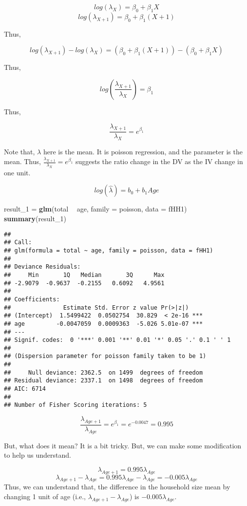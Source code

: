 \documentclass[]{book}
\newenvironment{Shaded}{\begin{snugshade}}{\end{snugshade}}
\newcommand{\DataTypeTok}[1]{\textcolor[rgb]{0.13,0.29,0.53}{#1}}
\newcommand{\DecValTok}[1]{\textcolor[rgb]{0.00,0.00,0.81}{#1}}
\newcommand{\KeywordTok}[1]{\textcolor[rgb]{0.13,0.29,0.53}{\textbf{#1}}}
\newcommand{\NormalTok}[1]{#1}
\newcommand{\OperatorTok}[1]{\textcolor[rgb]{0.81,0.36,0.00}{\textbf{#1}}}
\newcommand{\StringTok}[1]{\textcolor[rgb]{0.31,0.60,0.02}{#1}}
\begin{document}
\[log (\lambda_X) =\beta_0+\beta_1 X\]
\[log (\lambda_{X+1}) =\beta_0+\beta_1 (X+1)\]

Thus,

\[log (\lambda_{X+1})-log (\lambda_X) =(\beta_0+\beta_1 (X+1))-(\beta_0+\beta_1 X)\]

Thus,

\[log (\frac{\lambda_{X+1}}{\lambda_X}) =\beta_1\]

Thus,

\[\frac{\lambda_{X+1}}{\lambda_X} =e^{\beta_1}\]

Note that, \(\lambda\) here is the mean. It is poisson regression, and the parameter is the mean. Thus, \(\frac{\lambda_{X+1}}{\lambda_X} =e^{\beta_1}\) suggests the ratio change in the DV as the IV change in one unit.

\[log (\hat{\lambda}) =b_0+b_1 Age\]

\begin{Shaded}
\begin{Highlighting}[]
\NormalTok{result_}\DecValTok{1}\NormalTok{ =}\StringTok{ }\KeywordTok{glm}\NormalTok{(total }\OperatorTok{~}\StringTok{ }\NormalTok{age, }\DataTypeTok{family =}\NormalTok{ poisson, }\DataTypeTok{data =}\NormalTok{ fHH1)}
\KeywordTok{summary}\NormalTok{(result_}\DecValTok{1}\NormalTok{)}
\end{Highlighting}
\end{Shaded}

\begin{verbatim}
## 
## Call:
## glm(formula = total ~ age, family = poisson, data = fHH1)
## 
## Deviance Residuals: 
##     Min       1Q   Median       3Q      Max  
## -2.9079  -0.9637  -0.2155   0.6092   4.9561  
## 
## Coefficients:
##               Estimate Std. Error z value Pr(>|z|)    
## (Intercept)  1.5499422  0.0502754  30.829  < 2e-16 ***
## age         -0.0047059  0.0009363  -5.026 5.01e-07 ***
## ---
## Signif. codes:  0 '***' 0.001 '**' 0.01 '*' 0.05 '.' 0.1 ' ' 1
## 
## (Dispersion parameter for poisson family taken to be 1)
## 
##     Null deviance: 2362.5  on 1499  degrees of freedom
## Residual deviance: 2337.1  on 1498  degrees of freedom
## AIC: 6714
## 
## Number of Fisher Scoring iterations: 5
\end{verbatim}

\[\frac{\lambda_{Age+1}}{\lambda_{Age}} =e^{\beta_1}=e^{-0.0047}=0.995\]

But, what does it mean? It is a bit tricky. But, we can make some modification to help us understand.

\[\lambda_{Age+1} =0.995 \lambda_{Age}\]
\[\lambda_{Age+1} - \lambda_{Age}=0.995 \lambda_{Age}- \lambda_{Age}=-0.005 \lambda_{Age}\]
Thus, we can understand that, the difference in the household size mean by changing 1 unit of age (i.e., \(\lambda_{Age+1} - \lambda_{Age}\)) is \(-0.005 \lambda_{Age}\).
\end{document}
